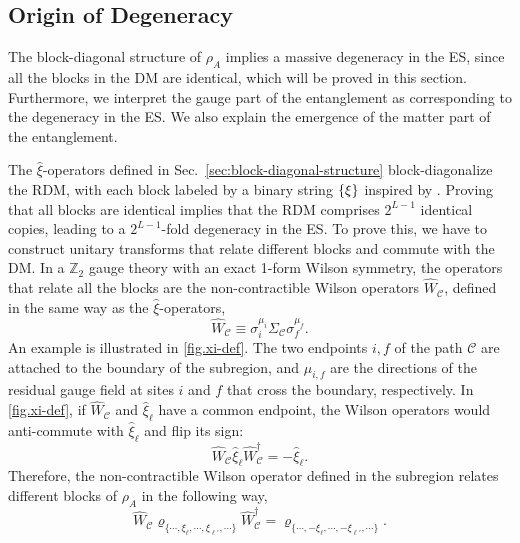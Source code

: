 \subsection{Origin of Degeneracy}\label{sec:origin_of_degeneracy}

The block-diagonal structure of $\rho_A$ implies a massive degeneracy in the ES, since all the blocks in the DM are identical, which will be proved in this section. Furthermore, we interpret the gauge part of the entanglement as corresponding to the degeneracy in the ES. We also explain the emergence of the matter part of the entanglement.

The $\hat{\xi}$-operators defined in Sec.~\ref{sec:block-diagonal-structure} block-diagonalize the RDM, with each block labeled by a binary string $\left\{ \xi \right\}$ inspired by \cite{Xu-Rakovszky-Knap-Pollmann_2025}. {Proving that all blocks are identical implies that the RDM comprises $2^{L-1}$ identical copies, leading to a $2^{L-1}$-fold degeneracy in the ES.} To prove this, we have to construct unitary transforms that relate different blocks and commute with the DM. In a $\mathbb{Z}_2$ gauge theory with an exact 1-form Wilson symmetry, the operators that relate all the blocks are the non-contractible Wilson operators $\hat{W}_{\mathcal{C}}$, defined in the same way as the $\hat{\xi}$-operators, 
\begin{equation}\label{eq.regional-global-wilson-def}
    \hat{W}_\mathcal{C} \equiv \sigma^{\mu_i}_{i}\Sigma_{\mathcal{C}}\sigma^{\mu_f}_{f}.
\end{equation}
An example is illustrated in \autoref{fig.xi-def}. The two endpoints $i,f$ of the path $\mathcal{C}$ are attached to the boundary of the subregion, and $\mu_{i,f}$ are the directions of the residual gauge field at sites $i$ and $f$ that cross the boundary, respectively. In \autoref{fig.xi-def}, if $\hat{W}_{\mathcal{C}}$ and $\hat{\xi}_{\ell}$ have a common endpoint, the Wilson operators would anti-commute with $\hat{\xi}_\ell$ and flip its sign:
\begin{equation}\label{eq.wilson-xi-flip}
    \hat{W}_\mathcal{C} \hat{\xi}_{\ell}\hat{W}_{\mathcal{C}}^\dagger = -\hat{\xi}_{\ell}.
\end{equation}
Therefore, the non-contractible Wilson operator defined in the subregion relates different blocks of $\rho_A$ in the following way,
\begin{equation}\label{equ.related-blocks}
    \hat{W}_{\mathcal{C}} 
    \varrho_{
            \{\cdots,
            \xi_{\ell},
            \cdots,
            \xi_{\ell'},
            \cdots\}
        }
    \hat{W}_{\mathcal{C}}^\dagger
    =
    \varrho_{
            \{\cdots,
            -\xi_{\ell},
            \cdots,
            -\xi_{\ell'},
            \cdots\}
        }.
\end{equation}

